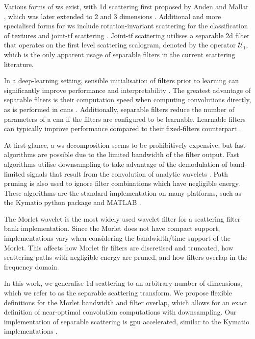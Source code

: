 Various forms of \ac{ws} exist, with \ac{1d} scattering first proposed by Anden and Mallat \cite{1dscattering1, ws}, which was later extended to 2 \cite{2dscattering} and 3 dimensions \cite{3dscattering, harmonicscattering}. Additional and more specialised forms for \ac{ws} include rotation-invariant scattering \cite{groupinvariantscattering} for the classification of textures and joint-\ac{tf} scattering \cite{ws_joint_tf, jointtfscattering2}. Joint-\ac{tf} scattering utilises a separable \ac{2d} filter that operates on the first level scattering scalogram, denoted by the operator $\mathcal{U}_1$, which is the only apparent usage of separable filters in the current scattering literature. 

In a deep-learning setting, sensible initialisation of filters prior to learning can significantly improve performance and interpretability \cite{sincnet}. The greatest advantage of separable filters is their computation speed when computing convolutions directly, as is performed in \acp{cnn} \cite{separablecnn}. Additionally, separable filters reduce the number of parameters of a \ac{cnn} if the filters are configured to be learnable. Learnable filters can typically improve performance compared to their fixed-filters counterpart \cite{scattering_birdsong}. 

At first glance, a \ac{ws} decomposition seems to be prohibitively expensive, but fast algorithms are possible due to the limited bandwidth of the filter output. Fast algorithms utilise downsampling to take advantage of the demodulation of band-limited signals that result from the convolution of analytic wavelets \cite{2dscattering, 3dscattering, 1dscattering1}. Path pruning is also used to ignore filter combinations which have negligible energy. These algorithms are the standard implementation on many platforms, such as the Kymatio python package \cite{kymatio} and MATLAB \cite{MATLAB}.

The Morlet wavelet is the most widely used wavelet filter for a scattering filter bank implementation. Since the Morlet does not have compact support, implementations vary when considering the bandwidth/time support of the Morlet. This affects how Morlet \ac{fir} filters are discretised and truncated, how scattering paths with negligible energy are pruned, and how filters overlap in the frequency domain. 

In this work, we generalise \ac{1d} scattering to an arbitrary number of dimensions, which we refer to as the separable scattering transform. We propose flexible definitions for the Morlet bandwidth and filter overlap, which allows for an exact definition of near-optimal convolution computations with downsampling. Our implementation of separable scattering is \ac{gpu} accelerated, similar to the Kymatio implementations \cite{kymatio}. 

